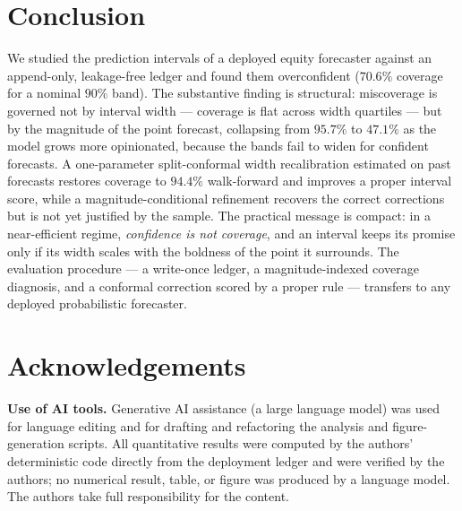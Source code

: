 \documentclass[11pt,a4paper]{article}
\begin{document}
\section{Conclusion}\label{sec:conclusion}
We studied the prediction intervals of a deployed equity forecaster against an
append-only, leakage-free ledger and found them overconfident ($70.6\%$ coverage for a
nominal $90\%$ band). The substantive finding is structural: miscoverage is governed
not by interval width --- coverage is flat across width quartiles --- but by the magnitude
of the point forecast, collapsing from $95.7\%$ to $47.1\%$ as the model grows more
opinionated, because the bands fail to widen for confident forecasts. A one-parameter
split-conformal width recalibration estimated on past forecasts restores coverage to
$94.4\%$ walk-forward and improves a proper interval score, while a
magnitude-conditional refinement recovers the correct corrections but is not yet
justified by the sample. The practical message is compact: in a near-efficient regime,
\emph{confidence is not coverage}, and an interval keeps its promise only if its width
scales with the boldness of the point it surrounds. The evaluation procedure --- a write-once
ledger, a magnitude-indexed coverage diagnosis, and a conformal correction scored by a
proper rule --- transfers to any deployed probabilistic forecaster.

\section*{Acknowledgements}
\textbf{Use of AI tools.} Generative AI assistance (a large language model) was used
for language editing and for drafting and refactoring the analysis and
figure-generation scripts. All quantitative results were computed by the authors'
deterministic code directly from the deployment ledger and were verified by the
authors; no numerical result, table, or figure was produced by a language model. The
authors take full responsibility for the content.
\end{document}
